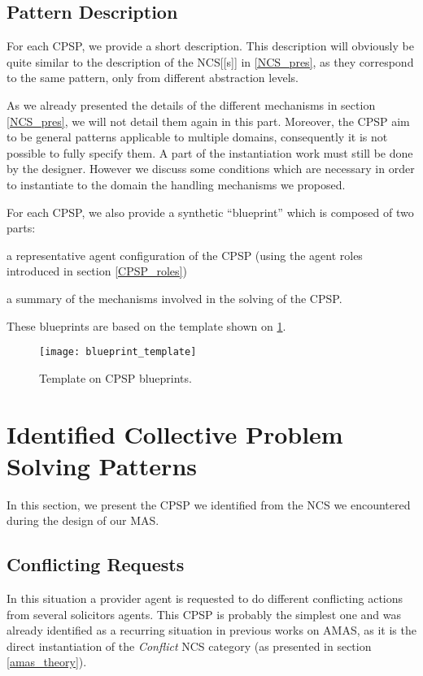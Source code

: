 \subsection{Pattern Description}

For each CPSP, we provide a short description. This description will obviously be quite similar to the description of the NCS[[s]] in \ref{NCS_pres}, as they correspond to the same pattern, only from different abstraction levels.

As we already presented the details of the different mechanisms in section \ref{NCS_pres}, we will not detail them again in this part. Moreover, the CPSP aim to be general patterns applicable to multiple domains, consequently it is not possible to fully specify them. A part of the instantiation work  must still be done by the designer. However we discuss some conditions which are necessary in order to instantiate to the domain the handling mechanisms we proposed.

For each CPSP, we also provide a synthetic \enquote{blueprint} which is composed of two parts:
\begin{compactenum}
\item a representative agent configuration of the CPSP (using the agent roles introduced in section \ref{CPSP_roles}) 
\item a summary of the mechanisms involved in the solving of the CPSP.
\end{compactenum}
These blueprints are based on the template shown on \figurename{} \ref{blueprint_template}.

\begin{figure}
\centering
\texttt{[image: blueprint\_template]}
\caption{Template on CPSP blueprints.}\label{blueprint_template}
\end{figure}

\section{Identified Collective Problem Solving Patterns}

In this section, we present the CPSP we identified from the NCS we encountered during the design of our MAS.

\subsection{Conflicting Requests}

In this situation a provider agent is requested to do different conflicting actions from several solicitors agents. This CPSP is probably the simplest one and was already identified as a recurring situation in previous works on AMAS, as it is the direct instantiation of the \emph{Conflict} NCS category (as presented in section \ref{amas_theory}).

